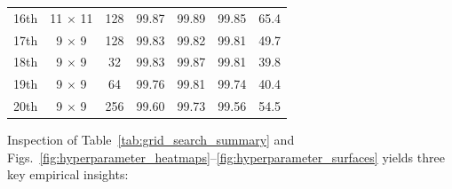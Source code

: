 \documentclass[manuscript,screen,review]{acmart}
\begin{document}
\begin{table}[t]
\begin{tabular*}{\textwidth}{@{\extracolsep{\fill}}ccccccc}
16th & 11 $\times$ 11          & 128          & 99.87           & 99.89  & 99.85  & 65.4 \\
17th & 9 $\times$ 9            & 128          & 99.83           & 99.82  & 99.81  & 49.7 \\
18th & 9 $\times$ 9            & 32           & 99.83           & 99.87  & 99.81  & 39.8 \\
19th & 9 $\times$ 9            & 64           & 99.76           & 99.81  & 99.74  & 40.4 \\
20th & 9 $\times$ 9            & 256          & 99.60           & 99.73  & 99.56  & 54.5 \\
\bottomrule
\end{tabular*}
\end{table}

Inspection of Table~\ref{tab:grid_search_summary} and Figs.~\ref{fig:hyperparameter_heatmaps}--\ref{fig:hyperparameter_surfaces} yields three key empirical insights:
\end{document}
